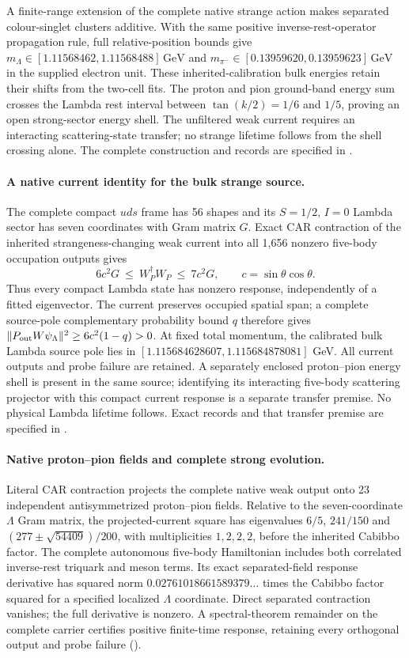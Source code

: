 A finite-range extension of the complete native strange action makes
separated colour-singlet clusters additive. With the same positive
inverse-rest-operator propagation rule, full relative-position bounds give
$m_\Lambda\in[1.11568462,1.11568488]\,\mathrm{GeV}$ and
$m_{\pi^-}\in[0.13959620,0.13959623]\,\mathrm{GeV}$ in the supplied electron
unit. These inherited-calibration bulk energies retain their shifts from
the two-cell fits. The proton and pion ground-band energy sum crosses the
Lambda rest interval between $\tan(k/2)=1/6$ and $1/5$, proving an open
strong-sector energy shell. The unfiltered weak current requires an
interacting scattering-state transfer; no strange lifetime follows from
the shell crossing alone.
The complete construction and records are specified in .

\paragraph{A native current identity for the bulk strange source.}
The complete compact $uds$ frame has 56 shapes and its
$S=1/2$, $I=0$ Lambda sector has seven coordinates with Gram matrix $G$.
Exact CAR contraction of the inherited strangeness-changing weak current
into all 1,656 nonzero five-body occupation outputs gives
\[
6c^2G\ \leq\ W_P^\dagger W_P\ \leq\ 7c^2G,
\qquad c=\sin\theta\cos\theta.
\]
Thus every compact Lambda state has nonzero response, independently of a
fitted eigenvector. The current preserves occupied spatial span; a complete
source-pole complementary probability bound $q$ therefore gives
$\|P_{\rm out}W\psi_\Lambda\|^2\geq6c^2(1-q)>0$.
At fixed total momentum, the calibrated bulk Lambda source pole lies in
$[1.115684628607,1.115684878081]$ GeV. All current outputs and probe failure
are retained. A separately enclosed proton--pion energy shell is present
in the same source; identifying its interacting five-body scattering
projector with this compact current response is a separate transfer
premise. No physical Lambda lifetime follows. Exact records and that
transfer premise are specified in .

\paragraph{Native proton--pion fields and complete strong evolution.}
Literal CAR contraction projects the complete native weak output onto
23 independent antisymmetrized proton--pion fields. Relative to the
seven-coordinate $\Lambda$ Gram matrix, the projected-current square
has eigenvalues $6/5$, $241/150$ and $(277\pm\sqrt{54409})/200$,
with multiplicities $1,2,2,2$, before the inherited Cabibbo factor.
The complete autonomous five-body Hamiltonian includes both correlated
inverse-rest triquark and meson terms. Its exact separated-field
response derivative has squared norm $0.02761018661589379\ldots$
times the Cabibbo factor squared for a specified localized $\Lambda$
coordinate. Direct separated contraction vanishes; the full derivative
is nonzero. A spectral-theorem remainder on the complete carrier
certifies positive finite-time response, retaining every orthogonal
output and probe failure ().

